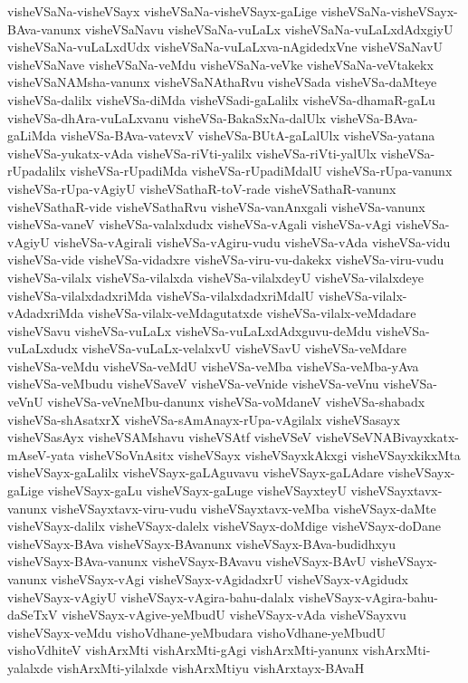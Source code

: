 {visheVSaNa-visheVSayx
visheVSaNa-visheVSayx-gaLige
visheVSaNa-visheVSayx-BAva-vanunx
visheVSaNavu
visheVSaNa-vuLaLx
visheVSaNa-vuLaLxdAdxgiyU
visheVSaNa-vuLaLxdUdx
visheVSaNa-vuLaLxva-nAgidedxVne
visheVSaNavU
visheVSaNave
visheVSaNa-veMdu
visheVSaNa-veVke
visheVSaNa-veVtakekx
visheVSaNAMsha-vanunx
visheVSaNAthaRvu
visheVSada
visheVSa-daMteye
visheVSa-dalilx
visheVSa-diMda
visheVSadi-gaLalilx
visheVSa-dhamaR-gaLu
visheVSa-dhAra-vuLaLxvanu
visheVSa-BakaSxNa-dalUlx
visheVSa-BAva-gaLiMda
visheVSa-BAva-vatevxV
visheVSa-BUtA-gaLalUlx
visheVSa-yatana
visheVSa-yukatx-vAda
visheVSa-riVti-yalilx
visheVSa-riVti-yalUlx
visheVSa-rUpadalilx
visheVSa-rUpadiMda
visheVSa-rUpadiMdalU
visheVSa-rUpa-vanunx
visheVSa-rUpa-vAgiyU
visheVSathaR-toV-rade
visheVSathaR-vanunx
visheVSathaR-vide
visheVSathaRvu
visheVSa-vanAnxgali
visheVSa-vanunx
visheVSa-vaneV
visheVSa-valalxdudx
visheVSa-vAgali
visheVSa-vAgi
visheVSa-vAgiyU
visheVSa-vAgirali
visheVSa-vAgiru-vudu
visheVSa-vAda
visheVSa-vidu
visheVSa-vide
visheVSa-vidadxre
visheVSa-viru-vu-dakekx
visheVSa-viru-vudu
visheVSa-vilalx
visheVSa-vilalxda
visheVSa-vilalxdeyU
visheVSa-vilalxdeye
visheVSa-vilalxdadxriMda
visheVSa-vilalxdadxriMdalU
visheVSa-vilalx-vAdadxriMda
visheVSa-vilalx-veMdagutatxde
visheVSa-vilalx-veMdadare
visheVSavu
visheVSa-vuLaLx
visheVSa-vuLaLxdAdxguvu-deMdu
visheVSa-vuLaLxdudx
visheVSa-vuLaLx-velalxvU
visheVSavU
visheVSa-veMdare
visheVSa-veMdu
visheVSa-veMdU
visheVSa-veMba
visheVSa-veMba-yAva
visheVSa-veMbudu
visheVSaveV
visheVSa-veVnide
visheVSa-veVnu
visheVSa-veVnU
visheVSa-veVneMbu-danunx
visheVSa-voMdaneV
visheVSa-shabadx
visheVSa-shAsatxrX
visheVSa-sAmAnayx-rUpa-vAgilalx
visheVSasayx
visheVSasAyx
visheVSAMshavu
visheVSAtf
visheVSeV
visheVSeVNABivayxkatx-mAseV-yata
visheVSoVnAsitx
visheVSayx
visheVSayxkAkxgi
visheVSayxkikxMta
visheVSayx-gaLalilx
visheVSayx-gaLAguvavu
visheVSayx-gaLAdare
visheVSayx-gaLige
visheVSayx-gaLu
visheVSayx-gaLuge
visheVSayxteyU
visheVSayxtavx-vanunx
visheVSayxtavx-viru-vudu
visheVSayxtavx-veMba
visheVSayx-daMte
visheVSayx-dalilx
visheVSayx-dalelx
visheVSayx-doMdige
visheVSayx-doDane
visheVSayx-BAva
visheVSayx-BAvanunx
visheVSayx-BAva-budidhxyu
visheVSayx-BAva-vanunx
visheVSayx-BAvavu
visheVSayx-BAvU
visheVSayx-vanunx
visheVSayx-vAgi
visheVSayx-vAgidadxrU
visheVSayx-vAgidudx
visheVSayx-vAgiyU
visheVSayx-vAgira-bahu-dalalx
visheVSayx-vAgira-bahu-daSeTxV
visheVSayx-vAgive-yeMbudU
visheVSayx-vAda
visheVSayxvu
visheVSayx-veMdu
vishoVdhane-yeMbudara
vishoVdhane-yeMbudU
vishoVdhiteV
vishArxMti
vishArxMti-gAgi
vishArxMti-yanunx
vishArxMti-yalalxde
vishArxMti-yilalxde
vishArxMtiyu
vishArxtayx-BAvaH
}
